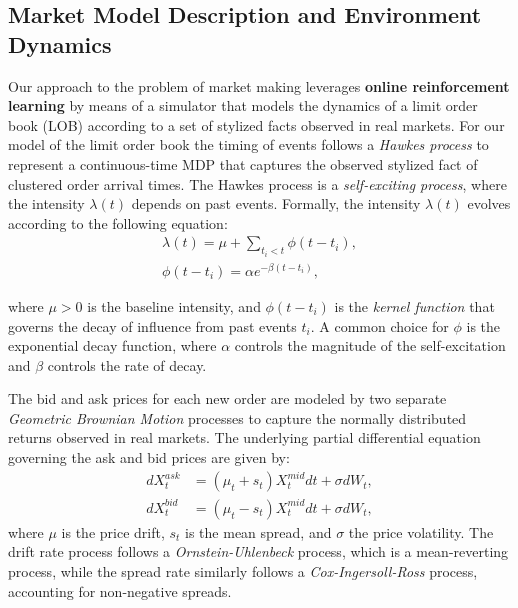 \subsection{Market Model Description and Environment Dynamics}
\label{subsec:market-model-description-and-environment-dynamics}
Our approach to the problem of market making leverages \textbf{online reinforcement learning} by means of a simulator that models the dynamics of
a limit order book (LOB) according to a set of stylized facts observed in real markets.
For our model of the limit order book the timing of events follows a \textit{Hawkes process}
to represent a continuous-time MDP that captures the observed stylized fact of clustered order arrival times.
The Hawkes process is a \textit{self-exciting process}, where the intensity \( \lambda(t) \) depends on past events.
Formally, the intensity \( \lambda(t) \) evolves according to the following equation:
\begin{equation*}
    \begin{aligned}
        \lambda(t) = \mu + \sum_{t_i < t} \phi(t - t_i),\\
        \phi(t - t_i) = \alpha e^{-\beta (t - t_i)},
    \end{aligned}
\end{equation*}

where \( \mu > 0 \) is the baseline intensity, and \( \phi(t - t_i) \) is the \textit{kernel function} that governs the decay of influence from past events \( t_i \).
A common choice for \( \phi \) is the exponential decay function, where \(\alpha\) controls the magnitude of the self-excitation and \(\beta\) controls the rate of decay.

The bid and ask prices for each new order are modeled by two separate \textit{Geometric Brownian Motion} processes to capture the normally distributed returns observed in real markets.
The underlying partial differential equation governing the ask and bid prices are given by:
\begin{equation*}
    \begin{aligned}
        dX_{t}^{ask} &= (\mu_t + s_t) X_{t}^{mid} dt + \sigma dW_t,\\
        dX_{t}^{bid} &= (\mu_t - s_t) X_{t}^{mid} dt + \sigma dW_t,
    \end{aligned}
    \label{eq:gbm}
\end{equation*}
where $\mu$ is the price drift, $s_t$ is the mean spread, and $\sigma$ the price volatility.
The drift rate process follows a \textit{Ornstein-Uhlenbeck} process, which is a mean-reverting process,
while the spread rate similarly follows a \textit{Cox-Ingersoll-Ross} process, accounting for non-negative spreads.


